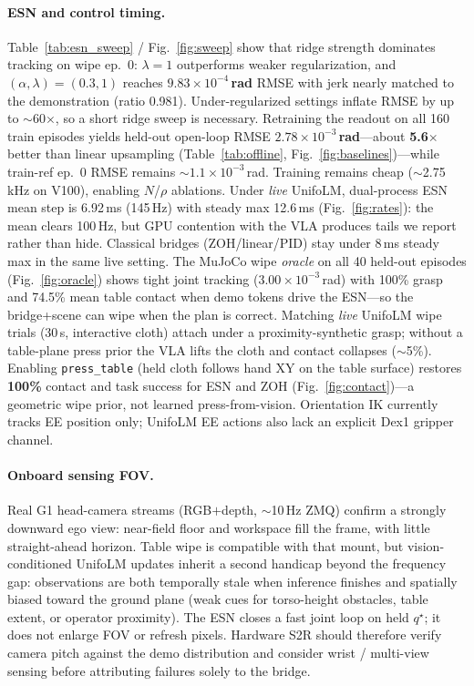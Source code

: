 \documentclass[conference]{IEEEtran}
\begin{document}
\paragraph{ESN and control timing.}
\mbox{Table~\ref{tab:esn_sweep}} / Fig.~\ref{fig:sweep} show that ridge strength dominates tracking on wipe ep.~0: $\lambda{=}1$ outperforms weaker regularization, and $(\alpha,\lambda)=(0.3,1)$ reaches \textbf{$9.83\times10^{-4}$\,rad} RMSE with jerk nearly matched to the demonstration (ratio 0.981).
Under-regularized settings inflate RMSE by up to $\sim$60$\times$, so a short ridge sweep is necessary.
Retraining the readout on all 160 train episodes yields held-out open-loop RMSE \textbf{$2.78\times10^{-3}$\,rad}---about \textbf{5.6$\times$} better than linear upsampling (Table~\ref{tab:offline}, Fig.~\ref{fig:baselines})---while train-ref ep.~0 RMSE remains $\sim$$1.1\times10^{-3}$\,rad.
Training remains cheap ($\sim$2.75\,kHz on V100), enabling $N$/$\rho$ ablations.
Under \emph{live} UnifoLM, dual-process ESN mean step is 6.92\,ms (145\,Hz) with steady max 12.6\,ms (Fig.~\ref{fig:rates}): the mean clears 100\,Hz, but GPU contention with the VLA produces tails we report rather than hide.
Classical bridges (ZOH/linear/PID) stay under 8\,ms steady max in the same live setting.
The MuJoCo wipe \emph{oracle} on all 40 held-out episodes (Fig.~\ref{fig:oracle}) shows tight joint tracking ($3.00\times10^{-3}$\,rad) with 100\% grasp and 74.5\% mean table contact when demo tokens drive the ESN---so the bridge+scene can wipe when the plan is correct.
Matching \emph{live} UnifoLM wipe trials (30\,s, interactive cloth) attach under a proximity-synthetic grasp; without a table-plane press prior the VLA lifts the cloth and contact collapses ($\sim$5\%).
Enabling \texttt{press\_table} (held cloth follows hand XY on the table surface) restores \textbf{100\%} contact and task success for ESN and ZOH (Fig.~\ref{fig:contact})---a geometric wipe prior, not learned press-from-vision.
Orientation IK currently tracks EE position only; UnifoLM EE actions also lack an explicit Dex1 gripper channel.

\paragraph{Onboard sensing FOV.}
Real G1 head-camera streams (RGB$+$depth, $\sim$10\,Hz ZMQ) confirm a strongly downward ego view: near-field floor and workspace fill the frame, with little straight-ahead horizon.
Table wipe is compatible with that mount, but vision-conditioned UnifoLM updates inherit a second handicap beyond the frequency gap: observations are both temporally stale when inference finishes and spatially biased toward the ground plane (weak cues for torso-height obstacles, table extent, or operator proximity).
The ESN closes a fast joint loop on held $q^{\star}$; it does not enlarge FOV or refresh pixels.
Hardware S2R should therefore verify camera pitch against the demo distribution and consider wrist / multi-view sensing before attributing failures solely to the bridge.
\end{document}
